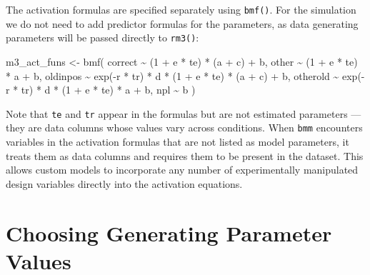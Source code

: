 \documentclass[
  man,
  floatsintext,
  longtable,
  nolmodern,
  notxfonts,
  notimes,
  colorlinks=true,linkcolor=blue,citecolor=blue,urlcolor=blue]{apa7}
\newenvironment{Shaded}{\begin{snugshade}}{\end{snugshade}}
\newcommand{\DecValTok}[1]{\textcolor[rgb]{0.68,0.00,0.00}{#1}}
\newcommand{\FunctionTok}[1]{\textcolor[rgb]{0.28,0.35,0.67}{#1}}
\newcommand{\NormalTok}[1]{\textcolor[rgb]{0.00,0.23,0.31}{#1}}
\newcommand{\OtherTok}[1]{\textcolor[rgb]{0.00,0.23,0.31}{#1}}
\newcommand{\SpecialCharTok}[1]{\textcolor[rgb]{0.37,0.37,0.37}{#1}}
\begin{document}
The activation formulas are specified separately using \texttt{bmf()}.
For the simulation we do not need to add predictor formulas for the
parameters, as data generating parameters will be passed directly to
\texttt{rm3()}:

\begin{Shaded}
\begin{Highlighting}[]
\NormalTok{m3\_act\_funs }\OtherTok{\textless{}{-}} \FunctionTok{bmf}\NormalTok{(}
\NormalTok{  correct  }\SpecialCharTok{\textasciitilde{}}\NormalTok{ (}\DecValTok{1} \SpecialCharTok{+}\NormalTok{ e }\SpecialCharTok{*}\NormalTok{ te) }\SpecialCharTok{*}\NormalTok{ (a }\SpecialCharTok{+}\NormalTok{ c) }\SpecialCharTok{+}\NormalTok{ b,}
\NormalTok{  other    }\SpecialCharTok{\textasciitilde{}}\NormalTok{ (}\DecValTok{1} \SpecialCharTok{+}\NormalTok{ e }\SpecialCharTok{*}\NormalTok{ te) }\SpecialCharTok{*}\NormalTok{ a }\SpecialCharTok{+}\NormalTok{ b,}
\NormalTok{  oldinpos }\SpecialCharTok{\textasciitilde{}} \FunctionTok{exp}\NormalTok{(}\SpecialCharTok{{-}}\NormalTok{r }\SpecialCharTok{*}\NormalTok{ tr) }\SpecialCharTok{*}\NormalTok{ d }\SpecialCharTok{*}\NormalTok{ (}\DecValTok{1} \SpecialCharTok{+}\NormalTok{ e }\SpecialCharTok{*}\NormalTok{ te) }\SpecialCharTok{*}\NormalTok{ (a }\SpecialCharTok{+}\NormalTok{ c) }\SpecialCharTok{+}\NormalTok{ b,}
\NormalTok{  otherold }\SpecialCharTok{\textasciitilde{}} \FunctionTok{exp}\NormalTok{(}\SpecialCharTok{{-}}\NormalTok{r }\SpecialCharTok{*}\NormalTok{ tr) }\SpecialCharTok{*}\NormalTok{ d }\SpecialCharTok{*}\NormalTok{ (}\DecValTok{1} \SpecialCharTok{+}\NormalTok{ e }\SpecialCharTok{*}\NormalTok{ te) }\SpecialCharTok{*}\NormalTok{ a }\SpecialCharTok{+}\NormalTok{ b,}
\NormalTok{  npl      }\SpecialCharTok{\textasciitilde{}}\NormalTok{ b}
\NormalTok{)}
\end{Highlighting}
\end{Shaded}

Note that \texttt{te} and \texttt{tr} appear in the formulas but are not
estimated parameters --- they are data columns whose values vary across
conditions. When \texttt{bmm} encounters variables in the activation
formulas that are not listed as model parameters, it treats them as data
columns and requires them to be present in the dataset. This allows
custom models to incorporate any number of experimentally manipulated
design variables directly into the activation equations.

\section{Choosing Generating Parameter
Values}\label{choosing-generating-parameter-values}
\end{document}
